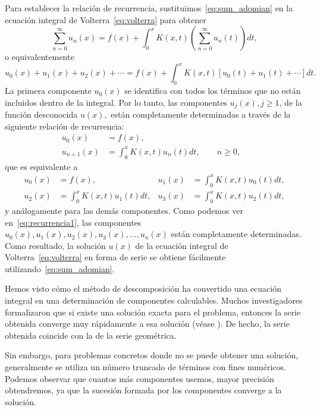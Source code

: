 Para establecer la relación de recurrencia, sustituimos~\eqref{eq:sum_adomian} en la ecuación integral de Volterra~\eqref{eq:volterra} para obtener 
\begin{equation}
	\sum_{n=0}^{\infty} u_n(x) = f(x) + \int_{0}^{x} K(x,t)(\sum_{n=0}^{\infty} u_n(t))dt,
\end{equation}
o equivalentemente
\begin{equation}
	u_0(x) + u_1(x) + u_2(x) + \cdots = f(x) + \int_{0}^{x} K(x,t)[u_0(t) + u_1(t) + \cdots]dt.
\end{equation}
La primera componente $u_0(x)$ se identifica con todos los términos que no están incluidos dentro de la integral. Por lo tanto, las componentes $u_j(x), j \geqslant 1$, de la función desconocida $u(x),$ están completamente determinadas a través de la siguiente relación de recurrencia:
\begin{align}
	u_0(x) &= f(x),      &   \\
	u_{n+1}(x) &=  \int_{0}^{x} K(x,t)u_n(t)dt, \qquad n \geqslant 0,         & 
\end{align}
que es equivalente a 
\begin{align}\label{eq:recurrencia1}
	u_0(x)&=f(x),          &  u_1(x) &= \int_{0}^{x} K(x,t)u_0(t)dt,      \\
	u_2(x)&= \int_{0}^{x} K(x,t)u_1(t)dt,   &  u_3(x)&= \int_{0}^{x} K(x,t)u_2(t)dt, 
\end{align}
y análogamente para las demás componentes. Como podemos ver en~\eqref{eq:recurrencia1}, las componentes $u_0(x), u_1(x), u_2(x), u_3(x),..., u_n(x)$ están completamente determinadas. Como resultado, la solución $u(x)$ de la ecuación integral de Volterra~\eqref{eq:volterra} en forma de serie se obtiene fácilmente utilizando~\eqref{eq:sum_adomian}.

\begin{observacion}
Hemos visto cómo el método de descomposición ha convertido una ecuación integral en una determinación de componentes calculables. Muchos investigadores formalizaron que si existe una solución exacta para el problema, entonces la serie obtenida converge muy rápidamente a esa solución (véase \cite{WazWaz}). De hecho, la serie obtenida coincide con la de la serie geométrica.

Sin embargo, para problemas concretos donde no se puede obtener una solución, generalmente se utiliza un número truncado de términos con fines numéricos. Podemos observar que cuantos más componentes usemos, mayor precisión obtendremos, ya que la sucesión formada por los componentes converge a la solución.
\end{observacion}

